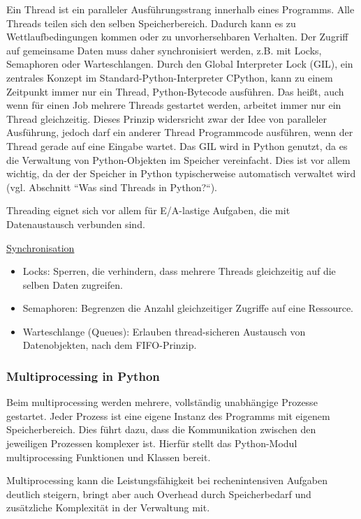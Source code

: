 \documentclass[a4paper, portrait, 12pt]{scrartcl} %
\begin{document}
	Ein Thread ist ein paralleler Ausführungsstrang innerhalb eines Programms. Alle Threads teilen sich den selben Speicherbereich. 
	Dadurch kann es zu Wettlaufbedingungen kommen oder zu unvorhersehbaren Verhalten. Der Zugriff auf gemeinsame Daten muss daher synchronisiert werden, z.B. mit Locks, Semaphoren oder Warteschlangen. 
	Durch den Global Interpreter Lock (GIL), ein zentrales Konzept im Standard-Python-Interpreter CPython, 
	kann zu einem Zeitpunkt immer nur ein Thread, Python-Bytecode ausführen. Das heißt, auch wenn für einen Job mehrere Threads gestartet werden, arbeitet immer nur ein Thread gleichzeitig.
	Dieses Prinzip widersricht zwar der Idee von paralleler Ausführung, jedoch darf ein anderer Thread Programmcode ausführen, wenn der Thread gerade auf eine Eingabe wartet.
	Das GIL wird in Python genutzt, da es die Verwaltung von Python-Objekten im Speicher vereinfacht. Dies ist vor allem wichtig, da der der Speicher in Python typischerweise
	automatisch verwaltet wird (vgl. \cite{Lang2024} Abschnitt ``Was sind Threads in Python{?}``). 

	Threading eignet sich vor allem für E/A-lastige Aufgaben, die mit Datenaustausch verbunden sind.

	\underline{Synchronisation}
	\begin{itemize}
		\item Locks: Sperren, die verhindern, dass mehrere Threads gleichzeitig auf die selben Daten zugreifen.
		\item Semaphoren: Begrenzen die Anzahl gleichzeitiger Zugriffe auf eine Ressource.
		\item Warteschlange (Queues): Erlauben thread-sicheren Austausch von Datenobjekten, nach dem FIFO-Prinzip.
	\end{itemize}

\subsubsection{Multiprocessing in Python}	
	
	Beim multiprocessing werden mehrere, vollständig unabhängige Prozesse gestartet. Jeder Prozess ist eine eigene Instanz des Programms mit eigenem Speicherbereich. Dies führt dazu, dass die
	Kommunikation zwischen den jeweiligen Prozessen komplexer ist. Hierfür stellt das Python-Modul multiprocessing Funktionen und Klassen bereit.

	Multiprocessing kann die Leistungsfähigkeit bei rechenintensiven Aufgaben deutlich steigern, bringt aber auch Overhead durch Speicherbedarf und zusätzliche Komplexität in der Verwaltung mit.
\end{document}
